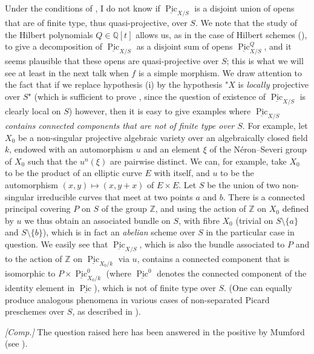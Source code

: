 \begin{remark}\label{fga3.v-3-remark-3.3}
    Under the conditions of , I do not know if $\underline{\operatorname{Pic}}_{X/S}$ is a disjoint union of opens that are of finite type, thus quasi-projective, over $S$.
    We note that the study of the Hilbert polynomials $Q\in\mathbb{Q}[t]$ allows us, as in the case of Hilbert schemes (), to give a decomposition of $\underline{\operatorname{Pic}}_{X/S}$ as a disjoint sum of opens $\underline{\operatorname{Pic}}_{X/S}^Q$, and it seems plausible that these opens are quasi-projective over $S$;
    this is what we will see at least in the next talk when $f$ is a simple morphism.
    We draw attention to the fact that if we replace hypothesis (i) by the hypothesis "$X$ is \emph{locally} projective over $S$" (which is sufficient to prove , since the question of existence of $\underline{\operatorname{Pic}}_{X/S}$ is clearly local on $S$) however, then it is easy to give examples where \emph{$\underline{\operatorname{Pic}}_{X/S}$ contains connected components that are not of finite type over $S$}.
    For example, let $X_0$ be a non-singular projective algebraic variety over an algebraically closed field $k$, endowed with an automorphism $u$ and an element $\xi$ of the Néron–Severi group of $X_0$ such that the $u^n(\xi)$ are pairwise distinct.
    We can, for example, take $X_0$ to be the product of an elliptic curve $E$ with itself, and $u$ to be the automorphism $(x,y)\mapsto(x,y+x)$ of $E\times E$.
    Let $S$ be the union of two non-singular irreducible curves that meet at two points $a$ and $b$.
    There is a connected principal covering $P$ on $S$ of the group $\mathbb{Z}$, and using the action of $\mathbb{Z}$ on $X_0$ defined by $u$ we thus obtain an associated bundle on $S$, with fibre $X_0$ (trivial on $S\setminus\{a\}$ and $S\setminus\{b\}$), which is in fact an \emph{abelian} scheme over $S$ in the particular case in question.
    We easily see that $\underline{\operatorname{Pic}}_{X/S}$, which is also the bundle associated to $P$ and to the action of $\mathbb{Z}$ on $\underline{\operatorname{Pic}}_{X_0/k}$ via $u$, contains a connected component that is isomorphic to $P\times\underline{\operatorname{Pic}}_{X_0/k}^0$ (where $\underline{\operatorname{Pic}}^0$ denotes the connected component of the identity element in $\underline{\operatorname{Pic}}$), which is not of finite type over $S$.
    (One can equally produce analogous phenomena in various cases of non-separated Picard preschemes over $S$, as described in ).

    \emph{[Comp.]}
    The question raised here has been answered in the positive by Mumford (see ).
\end{remark}
